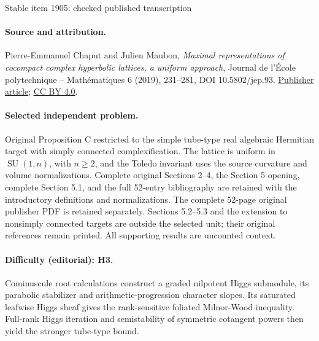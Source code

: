 \documentclass[10pt]{article}
\theoremstyle{definition}
\numberwithin{equation}{section}
\begin{document}
\begin{center}{\Large Stable item 1905: checked published transcription}\end{center}
\paragraph{Source and attribution.}
Pierre-Emmanuel Chaput and Julien Maubon, \emph{Maximal representations of cocompact complex hyperbolic lattices, a uniform approach}, Journal de l’École polytechnique -- Mathématiques 6 (2019), 231--281, DOI 10.5802/jep.93. \href{https://jep.centre-mersenne.org/articles/10.5802/jep.93/}{Publisher article}; \href{https://creativecommons.org/licenses/by/4.0/}{CC BY 4.0}.
\paragraph{Selected independent problem.}
Original Proposition C restricted to the simple tube-type real algebraic Hermitian target with simply connected complexification. The lattice is uniform in $\operatorname{SU}(1,n)$, with $n\geqslant2$, and the Toledo invariant uses the source curvature and volume normalizations. Complete original Sections 2--4, the Section 5 opening, complete Section 5.1, and the full 52-entry bibliography are retained with the introductory definitions and normalizations. The complete 52-page original publisher PDF is retained separately. Sections 5.2--5.3 and the extension to nonsimply connected targets are outside the selected unit; their original references remain printed. All supporting results are uncounted context.
\paragraph{Difficulty (editorial): H3.}
Cominuscule root calculations construct a graded nilpotent Higgs submodule, its parabolic stabilizer and arithmetic-progression character slopes. Its saturated leafwise Higgs sheaf gives the rank-sensitive foliated Milnor-Wood inequality. Full-rank Higgs iteration and semistability of symmetric cotangent powers then yield the stronger tube-type bound.
\end{document}
